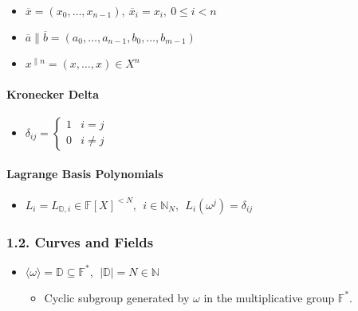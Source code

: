 \documentclass[
]{article}
\providecommand{\tightlist}{%
  \setlength{\itemsep}{0pt}\setlength{\parskip}{0pt}}
\begin{document}
\begin{itemize}
\tightlist
\item
  \(\overline{x} = (x_0, \dots, x_{n-1}),\ \overline{x}_i = x_i,\ 0 \leq i < n\)
\item
  \(\overline{a} \| \overline{b} = (a_0, \ldots, a_{n-1}, b_0, \ldots, b_{m-1})\)
\item
  \(x^{\|n} = (x, \ldots, x) \in X^n\)
\end{itemize}

\hypertarget{kronecker-delta}{%
\paragraph{Kronecker Delta}\label{kronecker-delta}}

\begin{itemize}
\tightlist
\item
  \(\delta_{ij} = \begin{cases} 1 & i = j \\ 0 & i \neq j \end{cases}\)
\end{itemize}

\hypertarget{lagrange-basis-polynomials}{%
\paragraph{Lagrange Basis
Polynomials}\label{lagrange-basis-polynomials}}

\begin{itemize}
\tightlist
\item
  \(L_i = L_{\mathbb{D}, i} \in \mathbb{F}[X]^{<N},\ \ i \in \mathbb{N}_N,\ \ L_i(\omega^j) = \delta_{ij}\)
\end{itemize}

\hypertarget{curves-and-fields}{%
\subsubsection{1.2. Curves and Fields}\label{curves-and-fields}}

\begin{itemize}
\tightlist
\item
  \(\langle \omega \rangle = \mathbb{D} \subseteq \mathbb{F}^*,\ \ |\mathbb{D}| = N \in \mathbb{N}\)

  \begin{itemize}
  \tightlist
  \item
    Cyclic subgroup generated by \(\omega\) in the multiplicative group
    \(\mathbb{F}^*\).
  \end{itemize}
\end{itemize}
\end{document}
